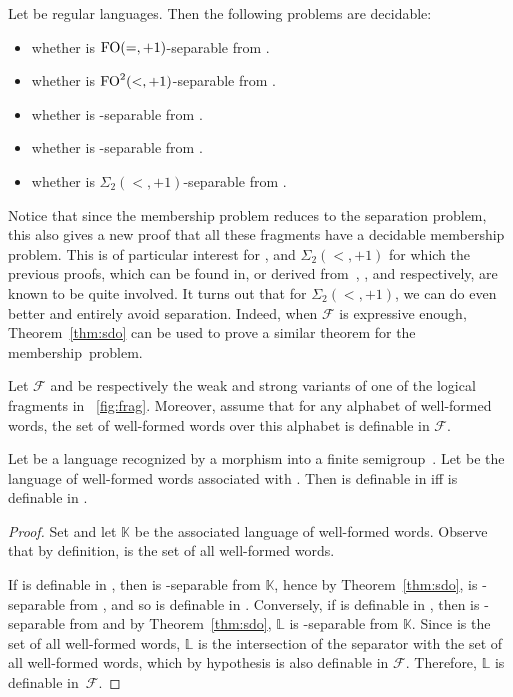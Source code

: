 \documentclass[a4paper,USenglish]{lipics}
\newcommand\Lbb{\ensuremath{\mathbb{L}}\xspace}
\newcommand\Kbb{\ensuremath{\mathbb{K}}\xspace}
\newcommand\Fs{\ensuremath{\mathcal{F}}\xspace}
\newcommand{\sdp}{\ensuremath{\Sigma_{2}(<,+1)}\xspace}
\newcommand{\foeqp}{\ensuremath{\textup{FO}(=,+1)}\xspace}
\newcommand{\fodp}{\ensuremath{\textup{FO}^2(<,+1)}\xspace}
\theoremstyle{plain}
\begin{document}
\begin{corollary} \label{cor:sdp}
  Let  be regular languages. Then the following problems are
  decidable:
  \begin{itemize}
  \item whether  is \foeqp-separable from .
  \item whether  is \fodp-separable from .
  \item whether  is -separable from .
  \item whether  is -separable from .
  \item whether  is \sdp-separable from .
  \end{itemize}
\end{corollary}

Notice that since the membership problem reduces to the separation problem,
this also gives a new proof that all these fragments have a decidable
membership problem. This is of particular interest for , 
and \sdp for which the previous proofs, which can be found in, or derived from~\cite{Str85,Almeida:1996c,PSDAD},
\cite{Knast:dd1:1983a}, and \cite{glasser-dd3/2,pw:wreath,pwdelta} respectively, are known to be quite
involved. It turns out that for \sdp, we can do even better and entirely avoid
separation. Indeed, when \Fs is expressive enough, Theorem~\ref{thm:sdo} can be
used to prove a similar theorem for the membership~problem.

\begin{theorem} \label{thm:memb}
  Let \Fs and  be respectively the weak and strong variants of
  one of the logical fragments in \figurename~\ref{fig:frag}. Moreover,
  assume that for any alphabet of well-formed words, the set of
  well-formed words over this alphabet is definable in \Fs.

  Let  be a language recognized by a morphism  into
  a finite semigroup~. Let  be the language of
  well-formed words associated with . Then  is definable in  iff\/
   is definable in .
\end{theorem}

\begin{proof}
  Set  and let \Kbb be the associated language of
  well-formed words. Observe that by definition,  is the
  set of all well-formed words.

  If  is definable in , then  is -separable from \Kbb,
  hence by Theorem~\ref{thm:sdo},  is -separable from , and so
   is definable in . Conversely, if  is definable in
  , then  is -separable from  and by Theorem~\ref{thm:sdo},
  \Lbb is -separable from \Kbb. Since  is
  the set of all well-formed words, \Lbb is the intersection of the
  separator with the set of all well-formed words, which by hypothesis is also definable in \Fs.
  Therefore, \Lbb is definable in~\Fs.
\end{proof}
\end{document}
